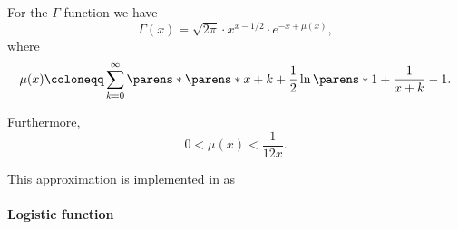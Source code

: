 \begin{theorem}\label{thm:stirlings_gamma_approximation}
  For the \( \Gamma \) function we have
  \begin{equation}\label{eq:thm:stirlings_gamma_approximation}
    \Gamma(x) = \sqrt{2 \pi} \cdot x^{x - 1 / 2} \cdot e^{-x + \mu(x)},
  \end{equation}
  where
  \begin{equation}\label{eq:thm:stirlings_gamma_approximation/mu}
    \mu(x) \coloneqq \sum_{k=0}^\infty \parens*{ \parens*{ x + k + \frac 1 2 } \ln\parens*{ 1 + \frac 1 {x + k} } - 1 }.
  \end{equation}

  Furthermore,
  \begin{equation}\label{eq:thm:stirlings_gamma_approximation/mu_inequality}
    0 < \mu(x) < \frac 1 {12x}.
  \end{equation}
\end{theorem}
\begin{comments}
  \item This approximation is implemented in \cite{notebook:code} as
  \begin{CodeRefDisplay}
  \end{CodeRefDisplay}
\end{comments}

\paragraph{Logistic function}

\begin{definition}\label{def:logistic_function}
\end{definition}
